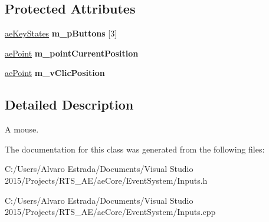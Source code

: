\subsection*{Protected Attributes}
\begin{DoxyCompactItemize}
\item 
\hyperlink{structae_core_1_1ae_key_states}{ae\+Key\+States} {\bfseries m\+\_\+p\+Buttons} \mbox{[}3\mbox{]}\hypertarget{classae_core_1_1ae_mouse_a2c274cbc4835d26c8d36c77da0311fe9}{}\label{classae_core_1_1ae_mouse_a2c274cbc4835d26c8d36c77da0311fe9}

\item 
\hyperlink{structae_core_1_1ae_point}{ae\+Point} {\bfseries m\+\_\+point\+Current\+Position}\hypertarget{classae_core_1_1ae_mouse_a2f3dffd3cb7d601b8fe65578c0ee2c6f}{}\label{classae_core_1_1ae_mouse_a2f3dffd3cb7d601b8fe65578c0ee2c6f}

\item 
\hyperlink{structae_core_1_1ae_point}{ae\+Point} {\bfseries m\+\_\+v\+Clic\+Position}\hypertarget{classae_core_1_1ae_mouse_aefc58d7ff43dac145a19611ebc0be249}{}\label{classae_core_1_1ae_mouse_aefc58d7ff43dac145a19611ebc0be249}

\end{DoxyCompactItemize}


\subsection{Detailed Description}
A mouse. 

The documentation for this class was generated from the following files\+:\begin{DoxyCompactItemize}
\item 
C\+:/\+Users/\+Alvaro Estrada/\+Documents/\+Visual Studio 2015/\+Projects/\+R\+T\+S\+\_\+\+A\+E/ae\+Core/\+Event\+System/Inputs.\+h\item 
C\+:/\+Users/\+Alvaro Estrada/\+Documents/\+Visual Studio 2015/\+Projects/\+R\+T\+S\+\_\+\+A\+E/ae\+Core/\+Event\+System/Inputs.\+cpp\end{DoxyCompactItemize}
